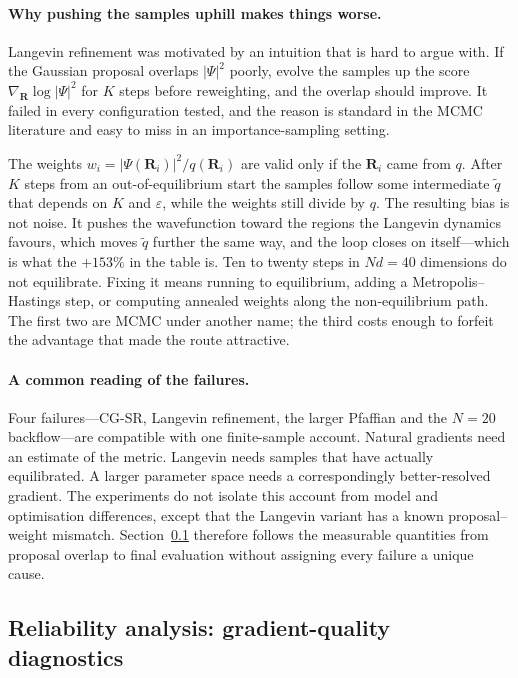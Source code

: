 \paragraph{Why pushing the samples uphill makes things worse.}
\label{sec:colloc-langevin-discussion}
Langevin refinement was motivated by an intuition that is hard to argue with. If the
Gaussian proposal overlaps $|\Psi|^2$ poorly, evolve the samples up the score
$\nabla_{\mathbf R}\log|\Psi|^2$ for $K$ steps before reweighting, and the overlap should
improve. It failed in every configuration tested, and the reason is standard in the MCMC
literature and easy to miss in an importance-sampling setting.

The weights $w_i=|\Psi(\mathbf R_i)|^2/q(\mathbf R_i)$ are valid only if the
$\mathbf R_i$ came from $q$. After $K$ steps from an out-of-equilibrium start the samples
follow some intermediate $\tilde q$ that depends on $K$ and $\varepsilon$, while the
weights still divide by $q$. The resulting bias is not noise. It pushes the wavefunction
toward the regions the Langevin dynamics favours, which moves $\tilde q$ further the same
way, and the loop closes on itself---which is what the $+153\%$ in the table is. Ten to
twenty steps in $Nd{=}40$ dimensions do not equilibrate. Fixing it means running to
equilibrium, adding a Metropolis--Hastings step, or computing annealed weights along the
non-equilibrium path. The first two are MCMC under another name; the third costs enough
to forfeit the advantage that made the route attractive.

\paragraph{A common reading of the failures.}
Four failures---CG-SR, Langevin refinement, the larger Pfaffian and the $N{=}20$
backflow---are compatible with one finite-sample account. Natural gradients need an estimate of the metric.
Langevin needs samples that have actually equilibrated. A larger parameter space needs a
correspondingly better-resolved gradient. The experiments do not isolate this account from
model and optimisation differences, except that the Langevin variant has a known proposal--weight
mismatch. Section~\ref{sec:colloc-reliability} therefore follows the measurable quantities
from proposal overlap to final evaluation without assigning every failure a unique cause.

\subsection{Reliability analysis: gradient-quality diagnostics}
\label{sec:colloc-reliability}

